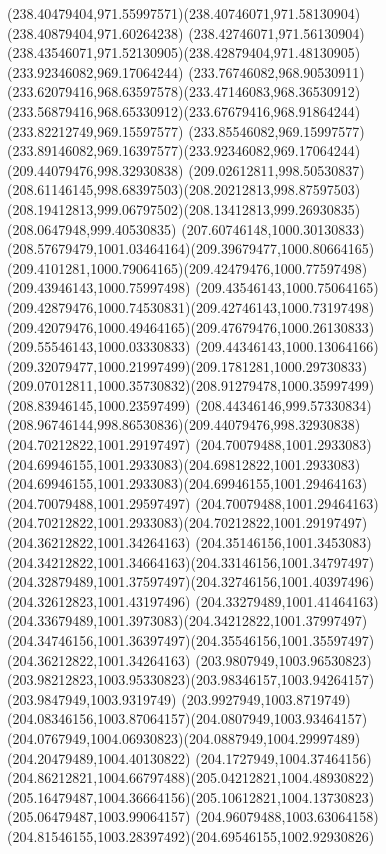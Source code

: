 {{\curveto(238.40479404,971.55997571)(238.40746071,971.58130904)(238.40879404,971.60264238)
\curveto(238.42746071,971.56130904)(238.43546071,971.52130905)(238.42879404,971.48130905)
\moveto(233.92346082,969.17064244)
\curveto(233.76746082,968.90530911)(233.62079416,968.63597578)(233.47146083,968.36530912)
\curveto(233.56879416,968.65330912)(233.67679416,968.91864244)(233.82212749,969.15597577)
\curveto(233.85546082,969.15997577)(233.89146082,969.16397577)(233.92346082,969.17064244)
\moveto(209.44079476,998.32930838)
\curveto(209.02612811,998.50530837)(208.61146145,998.68397503)(208.20212813,998.87597503)
\curveto(208.19412813,999.06797502)(208.13412813,999.26930835)(208.0647948,999.40530835)
\curveto(207.60746148,1000.30130833)(208.57679479,1001.03464164)(209.39679477,1000.80664165)
\curveto(209.4101281,1000.79064165)(209.42479476,1000.77597498)(209.43946143,1000.75997498)
\curveto(209.43546143,1000.75064165)(209.42879476,1000.74530831)(209.42746143,1000.73197498)
\curveto(209.42079476,1000.49464165)(209.47679476,1000.26130833)(209.55546143,1000.03330833)
\curveto(209.44346143,1000.13064166)(209.32079477,1000.21997499)(209.1781281,1000.29730833)
\curveto(209.07012811,1000.35730832)(208.91279478,1000.35997499)(208.83946145,1000.23597499)
\curveto(208.44346146,999.57330834)(208.96746144,998.86530836)(209.44079476,998.32930838)
\moveto(204.70212822,1001.29197497)
\curveto(204.70079488,1001.2933083)(204.69946155,1001.2933083)(204.69812822,1001.2933083)
\curveto(204.69946155,1001.2933083)(204.69946155,1001.29464163)(204.70079488,1001.29597497)
\curveto(204.70079488,1001.29464163)(204.70212822,1001.2933083)(204.70212822,1001.29197497)
\moveto(204.36212822,1001.34264163)
\curveto(204.35146156,1001.3453083)(204.34212822,1001.34664163)(204.33146156,1001.34797497)
\curveto(204.32879489,1001.37597497)(204.32746156,1001.40397496)(204.32612823,1001.43197496)
\curveto(204.33279489,1001.41464163)(204.33679489,1001.3973083)(204.34212822,1001.37997497)
\curveto(204.34746156,1001.36397497)(204.35546156,1001.35597497)(204.36212822,1001.34264163)
\moveto(203.9807949,1003.96530823)
\curveto(203.98212823,1003.95330823)(203.98346157,1003.94264157)(203.9847949,1003.9319749)
\curveto(203.9927949,1003.8719749)(204.08346156,1003.87064157)(204.0807949,1003.93464157)
\curveto(204.0767949,1004.06930823)(204.0887949,1004.29997489)(204.20479489,1004.40130822)
\curveto(204.1727949,1004.37464156)(204.86212821,1004.66797488)(205.04212821,1004.48930822)
\curveto(205.16479487,1004.36664156)(205.10612821,1004.13730823)(205.06479487,1003.99064157)
\curveto(204.96079488,1003.63064158)(204.81546155,1003.28397492)(204.69546155,1002.92930826)
}}

